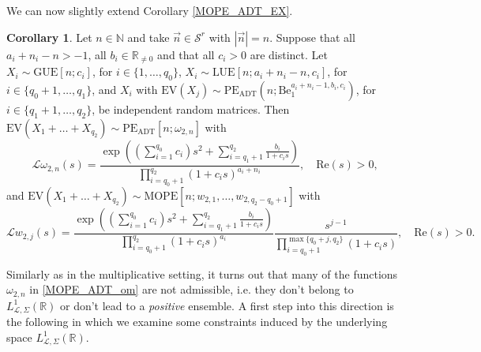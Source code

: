 \documentclass[a4paper,12pt,oneside]{article}
\theoremstyle{definition}
\newtheorem{cor}[defi]{Corollary}
\newcommand{\N}{\mathbb{N}}
\newcommand{\R}{\mathbb{R}}
\newcommand{\om}{\omega}
\newcommand{\sz}[1]{\left| \vec{#1} \right|}
\newcommand{\LT}[1]{\mathcal{L}#1}
\begin{document}
We can now slightly extend Corollary \ref{MOPE_ADT_EX}.

\begin{cor}
    Let $n\in\N$ and take $\vec{n}\in\mathcal{S}^r$ with $\sz{n}=n$. Suppose that all $a_i+n_i-n>-1$, all $b_i\in\R_{\neq 0}$ and that all $c_i>0$ are distinct. Let 
    $X_i\sim\text{GUE}[n;c_i]$, for $i\in\{1,\dots,q_0\}$,
    $ X_i\sim\text{LUE}[n;a_i+n_i-n,c_i]$, for $i\in\{q_0+1,\dots,q_1\}$, and 
    $X_i$ with $\text{EV}(X_j)\sim\text{PE}_{\text{ADT}}(n;\text{Be}_{1}^{a_i+n_i-1,b_i,c_i})$, for $i\in\{q_1+1,\dots,q_2\}$,
    be independent random matrices. Then $\text{EV}(X_1+\dots+X_{q_2})\sim\text{PE}_{\text{ADT}}[n;\om_{2,n}]$
    with
        $$ \LT{\om_{2,n}}(s) = \frac{\exp\left((\sum_{i=1}^{q_0} c_i)s^2 + \sum_{i=q_1+1}^{q_2} \frac{b_i}{1+c_i s}\right)}{\prod_{i=q_0+1}^{q_2} (1+c_i s)^{a_i+n_i}},\quad \text{Re}(s)>0, $$
    and $\text{EV}(X_1+\dots+X_{q_2})\sim\text{MOPE}[n;w_{2,1},\dots,w_{2,q_2-q_0+1}]$ with
        $$ \LT{w_{2,j}}(s) = \frac{\exp\left((\sum_{i=1}^{q_0} c_i)s^2 + \sum_{i=q_1+1}^{q_2} \frac{b_i}{1+c_i s}\right)}{\prod_{i=q_0+1}^{q_2} (1+c_i s)^{a_i}} \frac{s^{j-1}}{\prod_{i=q_0+1}^{\max\{q_0+j,q_2\}} (1+c_is)},\quad \text{Re}(s)>0.$$

\end{cor}


Similarly as in the multiplicative setting, it turns out that many of the functions $\om_{2,n}$ in \eqref{MOPE_ADT_om} are not admissible, i.e. they don't belong to $L^1_{\LT{},\Sigma}(\R)$ or don't lead to a \textit{positive} ensemble. A first step into this direction is the following in which we examine some constraints induced by the underlying space $L_{\LT{},\Sigma}^1(\R)$.
\end{document}
